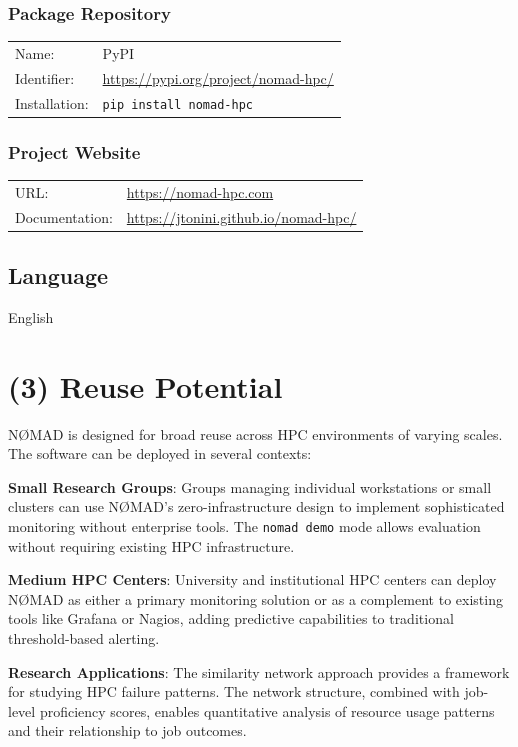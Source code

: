 \documentclass[11pt,a4paper]{article}
\begin{document}
\subsubsection*{Package Repository}
\begin{tabular}{ll}
Name: & PyPI \\
Identifier: & \url{https://pypi.org/project/nomad-hpc/} \\
Installation: & \texttt{pip install nomad-hpc} \\
\end{tabular}

\subsubsection*{Project Website}
\begin{tabular}{ll}
URL: & \url{https://nomad-hpc.com} \\
Documentation: & \url{https://jtonini.github.io/nomad-hpc/} \\
\end{tabular}

\subsection*{Language}
English

\section*{(3) Reuse Potential}

NØMAD is designed for broad reuse across HPC environments of varying scales. The software can be deployed in several contexts:

\textbf{Small Research Groups}: Groups managing individual workstations or small clusters can use NØMAD's zero-infrastructure design to implement sophisticated monitoring without enterprise tools. The \texttt{nomad demo} mode allows evaluation without requiring existing HPC infrastructure.

\textbf{Medium HPC Centers}: University and institutional HPC centers can deploy NØMAD as either a primary monitoring solution or as a complement to existing tools like Grafana or Nagios, adding predictive capabilities to traditional threshold-based alerting.

\textbf{Research Applications}: The similarity network approach provides a framework for studying HPC failure patterns. The network structure, combined with job-level proficiency scores, enables quantitative analysis of resource usage patterns and their relationship to job outcomes.
\end{document}
